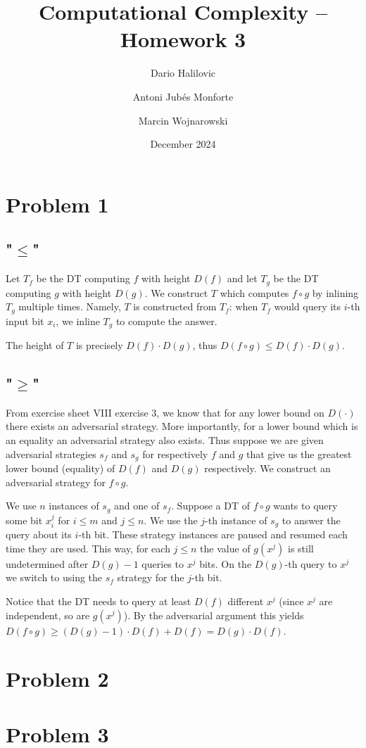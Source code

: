 \documentclass{article}
\title{Computational Complexity -- Homework 3}
\author{Dario Halilovic\and
Antoni Jubés Monforte\and
Marcin Wojnarowski}
\date{December 2024}
\begin{document}
\maketitle

\section*{Problem 1}

\subsection*{"$\le$"}

Let $T_f$ be the DT computing $f$ with height $D(f)$ and let $T_g$ be the DT computing $g$ with height $D(g)$. We construct $T$ which computes $f \circ g$ by inlining $T_g$ multiple times. Namely, $T$ is constructed from $T_f$: when $T_f$ would query its $i$-th input bit $x_i$, we inline $T_g$ to compute the answer.

The height of $T$ is precisely $D(f) \cdot D(g)$, thus $D(f \circ g) \le D(f) \cdot D(g)$.

\subsection*{"$\ge$"}

From exercise sheet VIII exercise 3, we know that for any lower bound on $D(\cdot)$ there exists an adversarial strategy. More importantly, for a lower bound which is an equality an adversarial strategy also exists. Thus suppose we are given adversarial strategies $s_f$ and $s_g$ for respectively $f$ and $g$ that give us the greatest lower bound (equality) of $D(f)$ and $D(g)$ respectively. We construct an adversarial strategy for $f \circ g$.

We use $n$ instances of $s_g$ and one of $s_f$. Suppose a DT of $f \circ g$ wants to query some bit $x_i^j$ for $i \le m$ and $j \le n$. We use the $j$-th instance of $s_g$ to answer the query about its $i$-th bit. These strategy instances are paused and resumed each time they are used. This way, for each $j \le n$ the value of $g(x^j)$ is still undetermined after $D(g)-1$ queries to $x^j$ bits. On the $D(g)$-th query to $x^j$ we switch to using the $s_f$ strategy for the $j$-th bit.

Notice that the DT needs to query at least $D(f)$ different $x^j$ (since $x^j$ are independent, so are $g(x^j)$). By the adversarial argument this yields $D(f \circ g) \ge (D(g) - 1) \cdot D(f) + D(f) = D(g) \cdot D(f)$.

\section*{Problem 2}

\section*{Problem 3}
\end{document}

